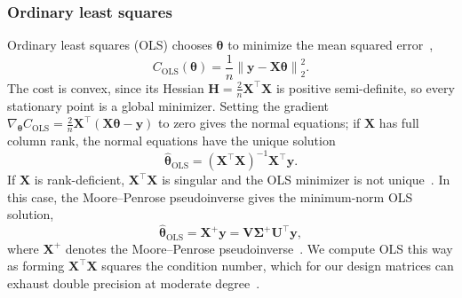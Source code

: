 \subsubsection{Ordinary least squares}
Ordinary least squares (OLS) chooses $\bm{\theta}$ to minimize the mean squared
error~\cite{mehta_2019},
\begin{equation}\label{eq:ols_cost}
    C_\text{OLS}(\bm{\theta}) = \frac{1}{n}\left\lVert \bm{y}
    - \bm{X}\bm{\theta} \right\rVert_2^2 .
\end{equation}
The cost is convex, since its Hessian $\bm{H} = \frac{2}{n}\bm{X}^\top\bm{X}$ is
positive semi-definite, so every stationary point is a global minimizer. Setting
the gradient $\nabla_{\bm{\theta}} C_\text{OLS} = \frac{2}{n}\bm{X}^\top
(\bm{X}\bm{\theta} - \bm{y})$ to zero gives the normal equations; if
$\bm{X}$ has full column rank, the normal equations have the unique solution
\begin{equation}\label{eq:ols-theta-hat}
    \hat{\bm{\theta}}_\text{OLS} = (\bm{X}^\top \bm{X})^{-1} \bm{X}^\top \bm{y}.
\end{equation}
If $\bm{X}$ is rank-deficient, $\bm{X}^\top\bm{X}$ is singular and the OLS
minimizer is not unique~\cite{mehta_2019}. In this case, the Moore--Penrose pseudoinverse gives
the minimum-norm OLS solution,
\begin{equation}\label{eq:ols-pseudoinverse}
    \hat{\bm{\theta}}_\text{OLS} = \bm{X}^{+}\bm{y}
    = \bm{V}\bm{\Sigma}^{+}\bm{U}^\top\bm{y},
\end{equation}
where $\bm{X}^{+}$ denotes the Moore--Penrose pseudoinverse~\cite{goodfellow_2016}.
We compute OLS this way as forming
$\bm{X}^\top\bm{X}$ squares the condition number, which for our design matrices
can exhaust double precision at moderate degree~\cite{hjorth-jensen_2026}.

